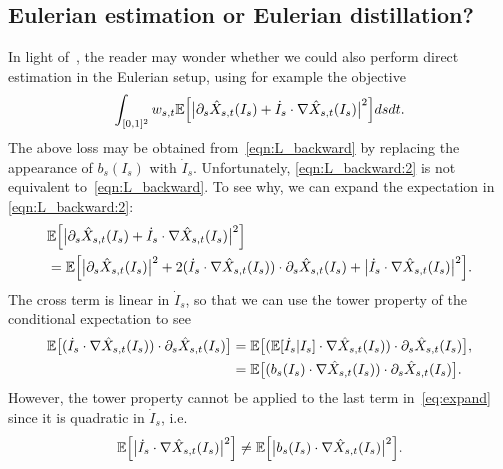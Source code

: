 \subsection{Eulerian estimation or Eulerian distillation?}
\label{sec:eul:est}
%
In light of~, the reader may wonder whether we could also perform direct estimation in the Eulerian setup, using for example the objective
%
\begin{equation}
	\label{eqn:L_backward:2}
	\int_{[0,1]^2} w_{s,t} \mathbb{E}\Big[\big|\partial_s \hat{X}_{s, t}(I_s) + \dot I_s  \cdot \nabla \hat{X}_{s, t}(I_s)\big|^2\Big] dsdt.
\end{equation}
%
The above loss may be obtained from~\eqref{eqn:L_backward} by replacing the appearance of $b_s(I_s)$ with $\dot I_s$.
%
Unfortunately, \eqref{eqn:L_backward:2} is not equivalent to~\eqref{eqn:L_backward}. To see why, we can expand the expectation in \eqref{eqn:L_backward:2}:
\begin{equation}
	\label{eq:expand}
	\begin{aligned}
		 & \mathbb{E}\Big[\big|\partial_s \hat{X}_{s, t}(I_s) + \dot I_s  \cdot \nabla \hat{X}_{s, t}(I_s)\big|^2\Big]                                                                                                     \\
		 & = \mathbb{E}\Big[\big|\partial_s \hat{X}_{s, t}(I_s)\big|^2 + 2 (\dot I_s  \cdot \nabla \hat{X}_{s, t}(I_s))\cdot \partial_s \hat{X}_{s, t}(I_s) + \big|\dot I_s  \cdot \nabla \hat{X}_{s, t}(I_s)\big|^2\Big].
	\end{aligned}
\end{equation}
%
The cross term is linear in $\dot I_s$, so that we can use the tower property of the conditional expectation to see
%
\begin{equation}
	\label{eq:cterm}
	\begin{aligned}
		\mathbb{E}\big[(\dot I_s  \cdot \nabla \hat{X}_{s, t}(I_s))\cdot \partial_s \hat{X}_{s, t}(I_s)\big] & = \mathbb{E}\big[(\mathbb{E}[\dot I_s|I_s]  \cdot \nabla \hat{X}_{s, t}(I_s))\cdot \partial_s \hat{X}_{s, t}(I_s)\big], \\
		                                                                                             & = \mathbb{E}\big[(b_s(I_s)  \cdot \nabla \hat{X}_{s, t}(I_s))\cdot \partial_s \hat{X}_{s, t}(I_s)\big] .
	\end{aligned}
\end{equation}
%
However, the tower property cannot be applied to the last term in~\eqref{eq:expand} since it is quadratic in $\dot I_s$, i.e.
%
\begin{equation}
	\label{eq:lterm}
	\begin{aligned}
		\mathbb{E}\Big[ \big|\dot I_s  \cdot \nabla \hat{X}_{s, t}(I_s)\big|^2\Big]\not= \mathbb{E}\Big[ \big|b_s(I_s)  \cdot \nabla \hat{X}_{s, t}(I_s)\big|^2\Big].
	\end{aligned}
\end{equation}
